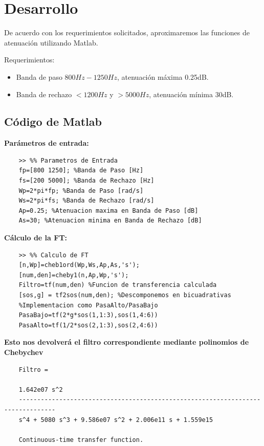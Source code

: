 \newpage
\section{Desarrollo}

\hspace{1mm} De acuerdo con los requerimientos solicitados, aproximaremos las funciones de atenuación utilizando Matlab.

\hspace{1mm} Requerimientos:
\begin{itemize}
	\item Banda de paso $800Hz - 1250Hz$, atenuación máxima 0.25dB.
	\item Banda de rechazo $<1200Hz$ y $>5000Hz$, atenuación mínima 30dB.
\end{itemize}

\subsection{Código de Matlab}

\textbf{Parámetros de entrada:}
\begin{verbatim}
	>> %% Parametros de Entrada
	fp=[800 1250]; %Banda de Paso [Hz]
	fs=[200 5000]; %Banda de Rechazo [Hz]
	Wp=2*pi*fp; %Banda de Paso [rad/s]
	Ws=2*pi*fs; %Banda de Rechazo [rad/s]
	Ap=0.25; %Atenuacion maxima en Banda de Paso [dB]
	As=30; %Atenuacion minima en Banda de Rechazo [dB]
\end{verbatim}
\textbf{Cálculo de la FT:}
\begin{verbatim}
	>> %% Calculo de FT
	[n,Wp]=cheb1ord(Wp,Ws,Ap,As,'s');
	[num,den]=cheby1(n,Ap,Wp,'s');
	Filtro=tf(num,den) %Funcion de transferencia calculada
	[sos,g] = tf2sos(num,den); %Descomponemos en bicuadrativas
	%Implementacion como PasaAlto/PasaBajo
	PasaBajo=tf(2*g*sos(1,1:3),sos(1,4:6))
	PasaAlto=tf(1/2*sos(2,1:3),sos(2,4:6))
\end{verbatim}

\textbf{Esto nos devolverá el filtro correspondiente mediante polinomios de Chebychev}

\begin{verbatim}
	Filtro =
	
	1.642e07 s^2
	--------------------------------------------------------------------------------
	s^4 + 5080 s^3 + 9.586e07 s^2 + 2.006e11 s + 1.559e15
	
	Continuous-time transfer function.
\end{verbatim}

\newpage

